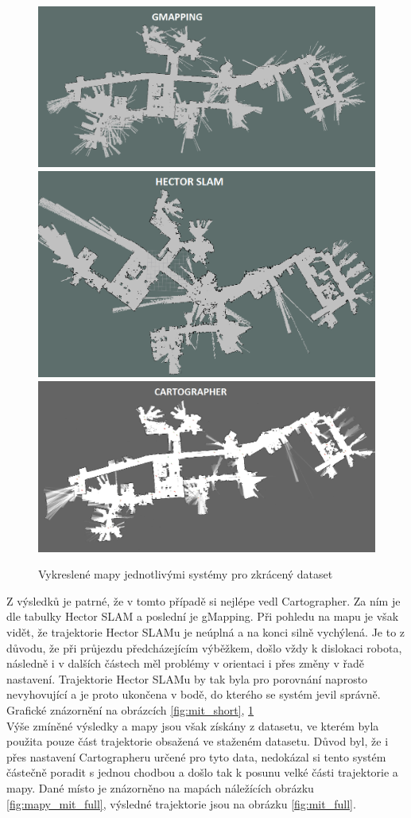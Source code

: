 \documentclass[12pt]{report}
\begin{document}
\begin{figure}[!ht]
	\begin{center}
		\includegraphics[width=0.6\columnwidth]{imgs/Maps/Bag/mit_stata_short/gmapping_mit_stata_short.png}
		\includegraphics[width=0.6\columnwidth]{imgs/Maps/Bag/mit_stata/hector_mit_stata.png}
		\includegraphics[width=0.6\columnwidth]{imgs/Maps/Bag/mit_stata_short/cartographer_mit_stata_short.png}
	\end{center}
	\caption{Vykreslené mapy jednotlivými systémy pro zkrácený dataset}
	\label{fig:mapy_mit_short}
\end{figure}

Z výsledků je patrné, že v tomto případě si nejlépe vedl Cartographer. Za ním je dle tabulky Hector SLAM a poslední je gMapping. Při pohledu na mapu je však vidět, že trajektorie Hector SLAMu je neúplná a na konci silně vychýlená. Je to z důvodu, že při průjezdu předcházejícím výběžkem, došlo vždy k dislokaci robota, následně i v dalších částech měl problémy v orientaci i přes změny v řadě nastavení. Trajektorie Hector SLAMu by tak byla pro porovnání naprosto nevyhovující a je proto ukončena v bodě, do kterého se systém jevil správně. Grafické znázornění na obrázcích \ref{fig:mit_short}, \ref{fig:mapy_mit_short}\\
\indent Výše zmíněné výsledky a mapy jsou však získány z datasetu, ve kterém byla použita pouze část trajektorie obsažená ve staženém datasetu. Důvod byl, že i přes nastavení Cartographeru určené pro tyto data, nedokázal si tento systém částečně poradit s jednou chodbou a došlo tak k posunu velké části trajektorie a mapy. Dané místo je znázorněno na mapách náležících obrázku \ref{fig:mapy_mit_full}, výsledné trajektorie jsou na obrázku \ref{fig:mit_full}. 
\end{document}
